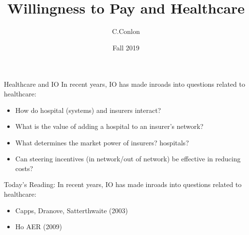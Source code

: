 \def\beamerclassoptions{[xcolor=pdftex,dvipsnames,table,mathserif,aspectratio=169]}


\usepackage[english]{babel}
\usepackage{pgf,pgfarrows,pgfnodes,pgfautomata,pgfheaps}
\usepackage{amsmath,amssymb,setspace}
\usepackage[latin1]{inputenc}
\usepackage[T1]{fontenc}
\usepackage{relsize}
\usepackage[absolute,overlay]{textpos} 
\newenvironment{reference}[2]{%
  \begin{textblock*}{\textwidth}(#1,#2) 
      \footnotesize\it\bgroup\color{red!50!black}}{\egroup\end{textblock*}} 



\title [Healthcare and IO]{Willingness to Pay and Healthcare}
\author{C.Conlon }
\date{Fall 2019}


\begin{frame}
\titlepage
\end{frame}


\begin{frame}{Healthcare and IO}
In recent years, IO has made inroads into questions related to healthcare:
\begin{itemize}
\item How do hospital (systems) and insurers interact?
\item What is the value of adding a hospital to an insurer's network?
\item What determines the market power of insurers? hospitals?
\item Can steering incentives (in network/out of network) be effective in reducing costs?
\end{itemize}
\end{frame}

\begin{frame}{Today's Reading:}
In recent years, IO has made inroads into questions related to healthcare:
\begin{itemize}
\item Capps, Dranove, Satterthwaite (2003)
\item Ho AER (2009)
\end{itemize}
\end{frame}




